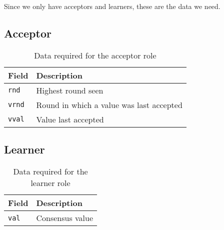 Since we only have acceptors and learners, these are the data we need.

\subsection{Acceptor}

\begin{table}[H]
\begin{tabular}{|l|l|}
\hline \textbf{Field} & \textbf{Description} \\
\hline \texttt{rnd} & Highest round seen \\
\hline \texttt{vrnd} & Round in which a value was last accepted \\
\hline \texttt{vval} & Value last accepted \\
\hline
\end{tabular}
\caption{Data required for the acceptor role}
\label{paxos.acceptor.fields}
\end{table}

\subsection{Learner}

\begin{table}[H]
\begin{tabular}{|l|l|}
\hline \textbf{Field} & \textbf{Description} \\
\hline \texttt{val} & Consensus value \\
\hline
\end{tabular}
\caption{Data required for the learner role}
\label{paxos.learner.fields}
\end{table}
